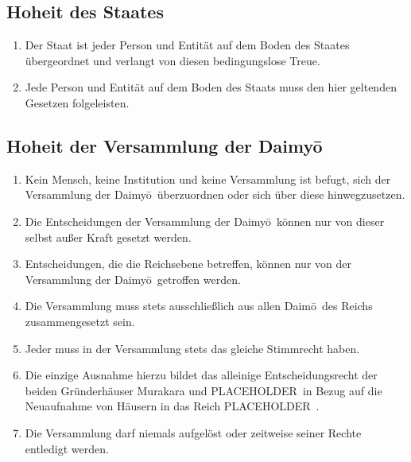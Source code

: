 \documentclass{article}
\newcommand{\longO}{ō}
\newcommand{\pl}{PLACEHOLDER\ }
\newcommand{\state}{\pl}
\begin{document}
\subsection{Hoheit des Staates}
\begin{enumerate}
    \item Der Staat ist jeder Person und Entität auf dem Boden des Staates übergeordnet und verlangt von diesen bedingungslose Treue.
    \item Jede Person und Entität auf dem Boden des Staats muss den hier geltenden Gesetzen folgeleisten.
\end{enumerate}

\subsection{Hoheit der Versammlung der Daimy\longO}
\begin{enumerate}
    \item Kein Mensch, keine Institution und keine Versammlung ist befugt, sich der Versammlung der Daimy\longO\ überzuordnen oder sich über diese hinwegzusetzen.
    \item Die Entscheidungen der Versammlung der Daimy\longO\ können nur von dieser selbst außer Kraft gesetzt werden.
    \item Entscheidungen, die die Reichsebene betreffen, können nur von der Versammlung der Daimy\longO\ getroffen werden.
    \item Die Versammlung muss stets ausschließlich aus allen Daim\longO\ des Reichs zusammengesetzt sein.
    \item Jeder muss in der Versammlung stets das gleiche Stimmrecht haben.
    \item Die einzige Ausnahme hierzu bildet das alleinige Entscheidungsrecht der beiden Gründerhäuser Murakara und \pl in Bezug auf die Neuaufnahme von Häusern in das Reich \state.
    \item Die Versammlung darf niemals aufgelöst oder zeitweise seiner Rechte entledigt werden.
\end{enumerate}
\end{document}

